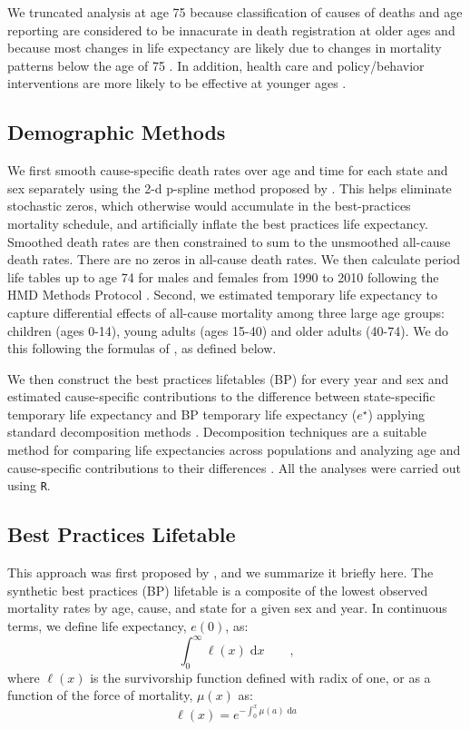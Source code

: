 \documentclass{article}
\newcommand{\dd}{\; \mathrm{d}}
\newcommand{\tc}{\quad\quad\text{,}}
\begin{document}
\begin{spacing}{1.5}
We truncated analysis at age 75 because classification of causes of deaths and age reporting are considered to be innacurate in death registration at older ages \citep{tobias2001} and because most changes in life expectancy are likely due to changes in mortality patterns below the age of 75 \citep{Aburto2015}. In addition, health care and policy/behavior interventions are more likely to be effective at younger ages \cite{elo2014}.


\subsection*{Demographic Methods}
We first smooth cause-specific death rates over age and time for each
state and sex separately using the 2-d p-spline method proposed by
\citet{GC2012}.
This helps eliminate stochastic zeros, which otherwise would accumulate in the best-practices mortality
schedule, and artificially inflate the best practices life expectancy. Smoothed death rates are
then constrained to sum to the unsmoothed all-cause death rates. There are no
zeros in all-cause death rates. We then calculate period life tables up to
age 74 for males and females from 1990 to 2010 following the HMD Methods
Protocol \citep{HMDMP}. Second, we estimated temporary life expectancy to
capture differential effects of all-cause mortality among three large age
groups: children (ages 0-14), young adults (ages 15-40) and older adults
(40-74). We do this following the formulas of \citet{arriaga1984}, as
defined below.

We then construct the best practices lifetables (BP) for every year and sex
and estimated cause-specific contributions to the difference between
state-specific temporary life expectancy and BP temporary life expectancy
($e^{\star}$) applying standard decomposition methods
\citep{horiuchi2008}. Decomposition techniques are a suitable method for comparing life expectancies across populations and analyzing age and cause-specific contributions to their differences \citep{preston2001}. All the analyses were carried out
using \texttt{R}.

\subsection*{Best Practices Lifetable}
This approach was first proposed by \citet{whelpton1947}, and we summarize it
briefly here. The synthetic best practices (BP) lifetable is a composite of the
lowest observed mortality rates by age, cause, and state for a given sex and year. In continuous terms, we define life expectancy, $e(0)$, as:
\begin{equation}
\int _0 ^\infty \ell(x) \dd x \tc
\end{equation}
where $\ell(x)$ is the survivorship function defined with radix of one, or as a
function of the force of mortality, $\mu(x)$ as:
\begin{equation}
\label{eq:lx}
\ell(x) = e^{-\int_0^x \mu(a) \dd a}
\end{equation}


\end{spacing}
\end{document}

